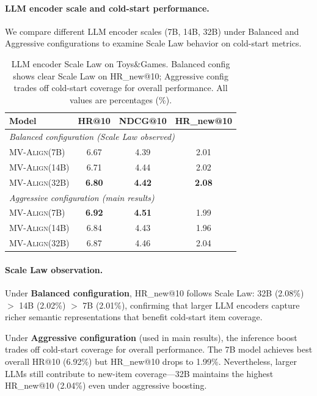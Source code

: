 \documentclass[sigconf,natbib=true]{acmart}
\newcommand{\model}{\textsc{MV-Align}\xspace}
\begin{document}
\paragraph{LLM encoder scale and cold-start performance.}
We compare different LLM encoder scales (7B, 14B, 32B) under Balanced and
Aggressive configurations to examine Scale Law behavior on cold-start metrics.

\begin{table}[t]
\caption{LLM encoder Scale Law on Toys\&Games. Balanced config shows clear
Scale Law on HR\_new@10; Aggressive config trades off cold-start coverage
for overall performance. All values are percentages (\%).}
\label{tab:scale_law}
\centering
\small
\begin{tabular}{lccc}
\toprule
\textbf{Model} & \textbf{HR@10} & \textbf{NDCG@10} & \textbf{HR\_new@10} \\
\midrule
\multicolumn{4}{l}{\textit{Balanced configuration (Scale Law observed)}} \\
\model (7B) & 6.67 & 4.39 & 2.01 \\
\model (14B) & 6.71 & 4.44 & 2.02 \\
\model (32B) & \textbf{6.80} & \textbf{4.42} & \textbf{2.08} \\
\midrule
\multicolumn{4}{l}{\textit{Aggressive configuration (main results)}} \\
\model (7B) & \textbf{6.92} & \textbf{4.51} & 1.99 \\
\model (14B) & 6.84 & 4.43 & 1.96 \\
\model (32B) & 6.87 & 4.46 & 2.04 \\
\bottomrule
\end{tabular}
\end{table}

\paragraph{Scale Law observation.}
Under \textbf{Balanced configuration}, HR\_new@10 follows Scale Law:
32B (2.08\%) $>$ 14B (2.02\%) $>$ 7B (2.01\%), confirming that larger LLM
encoders capture richer semantic representations that benefit cold-start
item coverage.

Under \textbf{Aggressive configuration} (used in main results), the inference
boost trades off cold-start coverage for overall performance. The 7B model
achieves best overall HR@10 (6.92\%) but HR\_new@10 drops to 1.99\%.
Nevertheless, larger LLMs still contribute to new-item coverage---32B
maintains the highest HR\_new@10 (2.04\%) even under aggressive boosting.
\end{document}
